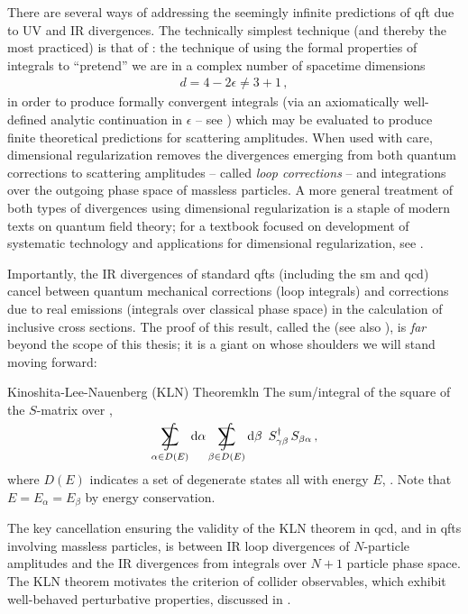 There are several ways of addressing the seemingly infinite predictions of \gls{qft} due to UV and IR divergences.
%
The technically simplest technique (and thereby the most practiced) is that of :
%
the technique of using the formal properties of integrals to ``pretend'' we are in a complex number of spacetime dimensions
\begin{align}
    d = 4 - 2\epsilon \neq 3 + 1
    \,,
\end{align}
in order to produce formally convergent integrals (via an axiomatically well-defined analytic continuation in \(\epsilon\) -- see ) which may be evaluated to produce finite theoretical predictions for scattering amplitudes.
%
When used with care, dimensional regularization removes the divergences emerging from both quantum corrections to scattering amplitudes -- called \textit{loop corrections} -- and integrations over the outgoing phase space of massless particles.
%
A more general treatment of both types of divergences using dimensional regularization is a staple of modern texts on quantum field theory;
%
for a textbook focused on development of systematic technology and applications for dimensional regularization, see .


Importantly, the IR divergences of standard \glspl{qft} (including the \gls{sm} and \gls{qcd}) cancel between quantum mechanical corrections (loop integrals) and corrections due to real emissions (integrals over classical phase space) in the calculation of inclusive cross sections.
%
The proof of this result, called the  \cite{Kinoshita:1962ur,Lee:1964is} (see also ), is \textit{far} beyond the scope of this thesis;
%
it is a giant on whose shoulders we will stand moving forward:

\begin{theorembox}{Kinoshita-Lee-Nauenberg (KLN) Theorem}{kln}
    The sum/integral of the square of the \(S\)-matrix over ,
    \begin{align}
        \SumInt_{\alpha \in D(E)}
        \dd \alpha
        \SumInt_{\beta \in  D(E)}
        \dd \beta
        \,\,\,
        S^\dagger_{\gamma \beta}
        \,
        S_{\beta \alpha}
        \,,
    \end{align}
    where \(D(E)\) indicates a set of degenerate states all with energy \(E\), .
    Note that \(E = E_\alpha = E_\beta\) by energy conservation.
\end{theorembox}
%
The key cancellation ensuring the validity of the KLN theorem in \gls{qcd}, and in \glspl{qft} involving massless particles, is between IR loop divergences of \(N\)-particle amplitudes and the IR divergences from integrals over \(N+1\) particle phase space.
%
The KLN theorem motivates the criterion of  collider \glspl{observable}, which exhibit well-behaved perturbative properties, discussed in .

